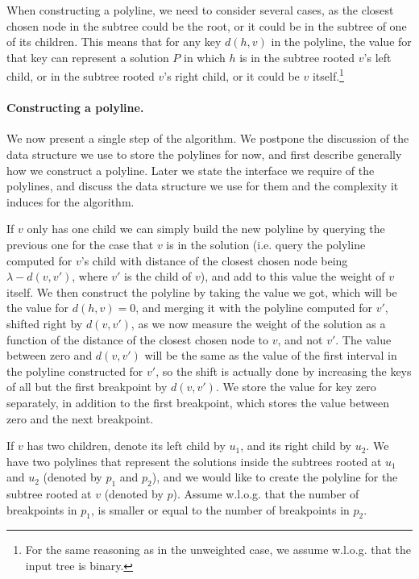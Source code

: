 \documentclass[11pt,a4paper]{article}
\theoremstyle{definition}
\theoremstyle{remark}
\begin{document}
When constructing a polyline, we need to consider several cases, as the closest chosen node in the subtree could be the root, or it could be in the subtree of one of its children. This means that for any key $d(h,v)$ in the polyline, the value for that key can represent a solution $P$ in which $h$ is in the subtree rooted $v$'s left child, or in the subtree rooted $v$'s right child, or it could be $v$ itself.\footnote{For the same reasoning as in the unweighted case, we assume w.l.o.g. that the input tree is binary.}

\paragraph{Constructing a polyline.} We now present a single step of the algorithm. We postpone the discussion of the data structure we use to store the polylines for now, and first describe generally how we construct a polyline. Later we state the interface we require of the polylines, and discuss the data structure we use for them and the complexity it induces for the algorithm.

If $v$ only has one child we can simply build the new polyline by querying the previous one for the case that $v$ is in the solution (i.e. query the polyline computed for $v$'s child with distance of the closest chosen node being $\lambda-d(v,v')$, where $v'$ is the child of $v$), and add to this value the weight of $v$ itself. We then construct the polyline by taking the value we got, which will be the value for $d(h,v)=0$, and merging it with the polyline computed for $v'$, shifted right by $d(v,v')$, as we now measure the weight of the solution as a function of the distance of the closest chosen node to $v$, and not $v'$. The value between zero and $d(v,v')$ will be the same as the value of the first interval in the polyline constructed for $v'$, so the shift is actually done by increasing the keys of all but the first breakpoint by $d(v,v')$. We store the value for key zero separately, in addition to the first breakpoint, which stores the value between zero and the next breakpoint.

If $v$ has two children, denote its left child by $u_1$, and its right child by $u_2$. We have two polylines that represent the solutions inside the subtrees rooted at $u_1$ and $u_2$ (denoted by $p_1$ and $p_2$), and we would like to create the polyline for the subtree rooted at $v$ (denoted by $p$).
Assume w.l.o.g. that the number of breakpoints in $p_1$, is smaller or equal to the number of breakpoints in $p_2$.
\end{document}
